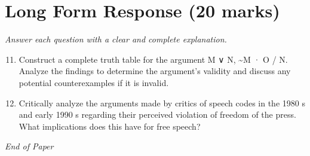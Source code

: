 \documentclass[12pt]{article}
\begin{document}
\section*{Long Form Response (20 marks)}
\textit{Answer each question with a clear and complete explanation.}
\begin{enumerate}[label=\arabic*.]
\setcounter{enumi}{10}
\item Construct a complete truth table for the argument M ∨ N, \textasciitilde{}M · O / N. Analyze the findings to determine the argument's validity and discuss any potential counterexamples if it is invalid.
\item Critically analyze the arguments made by critics of speech codes in the 1980 s and early 1990 s regarding their perceived violation of freedom of the press. What implications does this have for free speech?
\end{enumerate}

\vfill
\noindent\textit{End of Paper}
\end{document}

